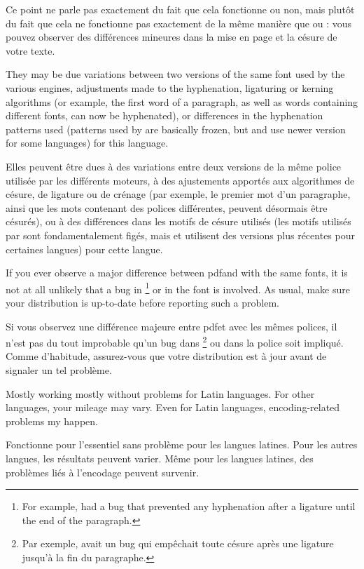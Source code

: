 \documentclass{lltxdoc}
\begin{document}
Ce point ne parle pas exactement du fait que cela fonctionne ou non, mais plutôt du fait que cela ne fonctionne pas exactement de la même manière que \pdftex ou \xetex: vous pouvez observer des différences mineures dans la mise en page et la césure de votre texte.

They may be due variations between two versions of the same font used by the
various engines, adjustments made to the hyphenation, ligaturing or kerning
algorithms (or example, the first word of a paragraph, as well as words
containing different fonts, can now be hyphenated), or differences in the
hyphenation patterns used (patterns used by \pdftex are basically frozen, but
\luatex and \xetex use newer version for some languages) for this language.

Elles peuvent être dues à des variations entre deux versions de la même police utilisée par les différents moteurs, à des ajustements apportés aux algorithmes de césure, de ligature ou de crénage (par exemple, le premier mot d'un paragraphe, ainsi que les mots contenant des polices différentes, peuvent désormais être césurés), ou à des différences dans les motifs de césure utilisés (les motifs utilisés par \pdftex sont fondamentalement figés, mais \luatex et \xetex utilisent des versions plus récentes pour certaines langues) pour cette langue.

If you ever observe a major difference between pdf\latex and \lualatex with
the same fonts, it is not at all unlikely that a bug in \luatex\footnote{For
  example,  had a bug that prevented any hyphenation after a
  \code{-{}-{}-} ligature until the end of the paragraph.} or in the font is
involved. As usual, make sure your distribution is up-to-date before reporting
such a problem.

Si vous observez une différence majeure entre pdf\latex et \lualatex avec les mêmes polices, il n'est pas du tout improbable qu'un bug dans \luatex\footnote{Par exemple,  avait un bug qui empêchait toute césure après une ligature \code{-{}-{}-} jusqu'à la fin du paragraphe.} ou dans la police soit impliqué. Comme d'habitude, assurez-vous que votre distribution est à jour avant de signaler un tel problème.

Mostly working mostly without problems for Latin languages. For other
languages, your mileage may vary. Even for Latin languages, encoding-related
problems my happen.

Fonctionne pour l'essentiel sans problème pour les langues latines. Pour les autres langues, les résultats peuvent varier. Même pour les langues latines, des problèmes liés à l'encodage peuvent survenir.
\end{document}
